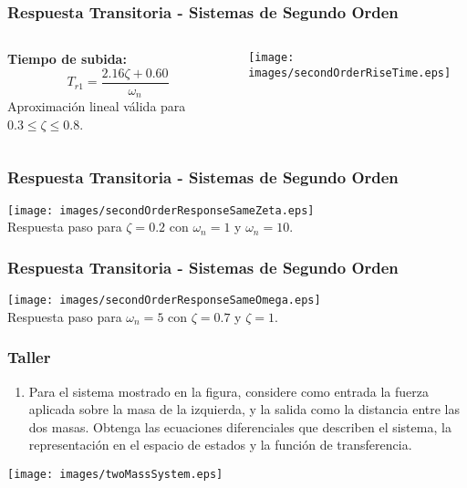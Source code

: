 \documentclass[aspectratio=169,handout]{beamer}
\theoremstyle{definition}
\theoremstyle{plain}
\theoremstyle{remark}
\newcounter{saveenumi}
\newcommand{\seti}{\setcounter{saveenumi}{\value{enumi}}}
\begin{document}
\begin{frame}\frametitle{Respuesta Transitoria - Sistemas de Segundo Orden}
\vspace*{3mm}
\begin{columns}
 \begin{column}{0.3\textwidth}
 \textbf{Tiempo de subida:}
 \begin{equation*}
   T_{r1} = \frac{2.16\zeta + 0.60}{\omega_n}
 \end{equation*}
 Aproximación lineal válida para $0.3 \leq \zeta \leq 0.8$.
 \end{column} 
 \begin{column}{0.7\textwidth}
  \centering
  \texttt{[image: images/secondOrderRiseTime.eps]}
 \end{column} 
\end{columns}
\end{frame}

\begin{frame}\frametitle{Respuesta Transitoria - Sistemas de Segundo Orden}
\vspace*{3mm}
\centering
\texttt{[image: images/secondOrderResponseSameZeta.eps]}\\
Respuesta paso para $\zeta = 0.2$ con $\omega_n = 1$ y $\omega_n = 10$.
\end{frame}

\begin{frame}\frametitle{Respuesta Transitoria - Sistemas de Segundo Orden}
\vspace*{3mm}
\centering
\texttt{[image: images/secondOrderResponseSameOmega.eps]}\\
Respuesta paso para $\omega_n = 5$ con $\zeta = 0.7$ y $\zeta = 1$.
\end{frame}

\begin{frame}[c]\frametitle{Taller}
\begin{enumerate}
  \item Para el sistema mostrado en la figura, considere como entrada la fuerza aplicada sobre la masa de la izquierda, y la salida como la distancia entre las dos masas. Obtenga las ecuaciones diferenciales que describen el sistema, la representación en el espacio de estados y la función de transferencia.
  \seti
\end{enumerate}
\begin{center}
  \texttt{[image: images/twoMassSystem.eps]}
\end{center}
\end{frame}
\end{document}
